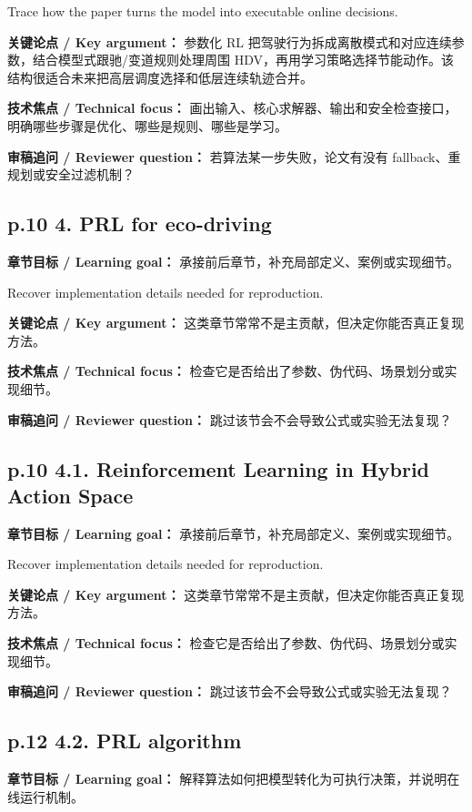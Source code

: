 \documentclass[UTF8,a4paper,11pt,fontset=fandol]{ctexart}
\begin{document}
Trace how the paper turns the model into executable online decisions.

\textbf{关键论点 / Key argument：} 参数化 RL 把驾驶行为拆成离散模式和对应连续参数，结合模型式跟驰/变道规则处理周围 HDV，再用学习策略选择节能动作。该结构很适合未来把高层调度选择和低层连续轨迹合并。

\textbf{技术焦点 / Technical focus：} 画出输入、核心求解器、输出和安全检查接口，明确哪些步骤是优化、哪些是规则、哪些是学习。

\textbf{审稿追问 / Reviewer question：} 若算法某一步失败，论文有没有 fallback、重规划或安全过滤机制？

\subsection*{p.10 4. PRL for eco-driving}
\textbf{章节目标 / Learning goal：} 承接前后章节，补充局部定义、案例或实现细节。

Recover implementation details needed for reproduction.

\textbf{关键论点 / Key argument：} 这类章节常常不是主贡献，但决定你能否真正复现方法。

\textbf{技术焦点 / Technical focus：} 检查它是否给出了参数、伪代码、场景划分或实现细节。

\textbf{审稿追问 / Reviewer question：} 跳过该节会不会导致公式或实验无法复现？

\subsection*{p.10 4.1. Reinforcement Learning in Hybrid Action Space}
\textbf{章节目标 / Learning goal：} 承接前后章节，补充局部定义、案例或实现细节。

Recover implementation details needed for reproduction.

\textbf{关键论点 / Key argument：} 这类章节常常不是主贡献，但决定你能否真正复现方法。

\textbf{技术焦点 / Technical focus：} 检查它是否给出了参数、伪代码、场景划分或实现细节。

\textbf{审稿追问 / Reviewer question：} 跳过该节会不会导致公式或实验无法复现？

\subsection*{p.12 4.2. PRL algorithm}
\textbf{章节目标 / Learning goal：} 解释算法如何把模型转化为可执行决策，并说明在线运行机制。
\end{document}

